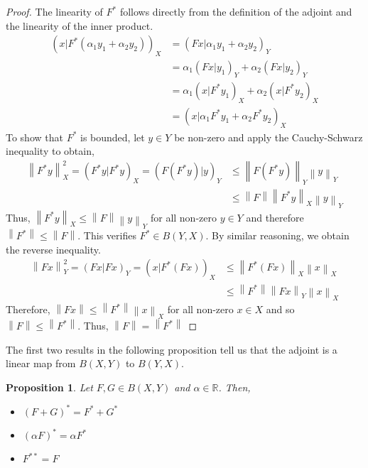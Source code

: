 \documentclass[12pt]{article}
\newcommand*{\norm}[1]{\left\lVert#1\right\rVert}
\newtheorem{prop}{Proposition}
\begin{document}
\begin{proof} 
The linearity of $F^*$ follows directly from the definition of the adjoint and the linearity of the inner product. 
\begin{align*} 
(x|F^*(\alpha_1 y_1 + \alpha_2 y_2))_X &= (Fx|\alpha_1 y_1 + \alpha_2 y_2)_Y \\
                                                               &= \alpha_1(Fx|y_1)_Y + \alpha_2(Fx|y_2)_Y \\
                                                               &= \alpha_1(x|F^*y_1)_X + \alpha_2(x|F^*y_2)_X \\
                                                               &= (x|\alpha_1 F^*y_1 + \alpha_2 F^*y_2)_X
\end{align*} 
To show that $F^*$ is bounded, let $y \in Y$ be non-zero and apply the Cauchy-Schwarz inequality to obtain,
\begin{align*} 
\norm{F^*y}^2_X = (F^*y|F^*y)_X = (F(F^*y)|y)_Y &\leq \norm{F(F^*y)}_Y\norm{y}_Y \\
                                                                               &\leq \norm{F}\norm{F^*y}_X\norm{y}_Y
\end{align*}
Thus, $\norm{F^*y}_X \leq \norm{F}\norm{y}_Y$ for all non-zero $y \in Y$ and therefore $\norm{F^*} \leq \norm{F}$. 
This verifies $F^* \in B(Y, X)$. By similar reasoning, we obtain the reverse inequality. 
\begin{align*} 
\norm{Fx}^2_Y = (Fx|Fx)_Y = (x|F^*(Fx))_X &\leq \norm{F^*(Fx)}_X\norm{x}_X \\
                                                                      &\leq \norm{F^*}\norm{Fx}_Y\norm{x}_X
\end{align*}
Therefore, $\norm{Fx} \leq \norm{F^*}\norm{x}_X$ for all non-zero $x \in X$ and so $\norm{F} \leq \norm{F^*}$. 
Thus, $\norm{F} = \norm{F^*}$
\end{proof} 

The first two results in the following proposition tell us that the adjoint is a linear map from $B(X, Y)$
to $B(Y, X)$.

\begin{prop} 
Let $F, G \in B(X, Y)$ and $\alpha \in \mathbb{R}$. Then,
\begin{itemize}
\item $(F + G)^* = F^* + G^*$
\item $(\alpha F)^* = \alpha F^*$
\item $F^{**} = F$
\end{itemize}  
\end{prop}
\end{document}
